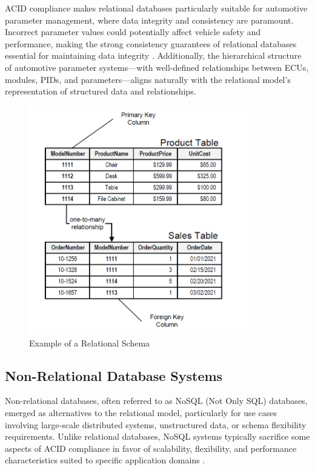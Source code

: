ACID compliance makes relational databases particularly suitable for automotive parameter management, where data integrity and consistency are paramount. Incorrect parameter values could potentially affect vehicle safety and performance, making the strong consistency guarantees of relational databases essential for maintaining data integrity \cite{staron2021automotive}. Additionally, the hierarchical structure of automotive parameter systems—with well-defined relationships between \acp{ECU}, modules, PIDs, and parameters—aligns naturally with the relational model's representation of structured data and relationships.

\begin{figure}[ht]
    \centering
    \includegraphics[width=0.85\textwidth]{figures/relational_schema.png}
    \caption{Example of a Relational Schema \cite{noah2024relational}}
    \label{fig:relational-schema}
\end{figure}

\subsection{Non-Relational Database Systems}
\label{subsec:non-relational-database-systems}

Non-relational databases, often referred to as NoSQL (Not Only SQL) databases, emerged as alternatives to the relational model, particularly for use cases involving large-scale distributed systems, unstructured data, or schema flexibility requirements. Unlike relational databases, NoSQL systems typically sacrifice some aspects of ACID compliance in favor of scalability, flexibility, and performance characteristics suited to specific application domains \cite{bhattacherjee2015principles}.

